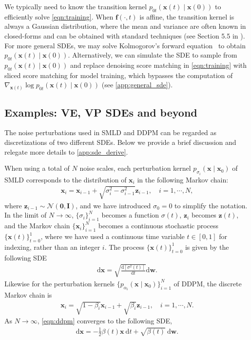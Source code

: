 \documentclass{article} %
\newcommand{\ud}{\mathrm{d}}
\newcommand{\mcal}{\mathcal}
\newcommand{\bfx}{\mathbf{x}}
\newcommand{\bfw}{\mathbf{w}}
\newcommand{\bfz}{\mathbf{z}}
\newcommand{\bfI}{\mathbf{I}}
\newcommand{\bff}{\mathbf{f}}
\newcommand{\bfzero}{\mathbf{0}}
\begin{document}
We typically need to know the transition kernel $p_{0t}(\bfx(t) \mid \bfx(0))$ to efficiently solve \cref{eqn:training}. When $\bff(\cdot, t)$ is affine, the transition kernel is always a Gaussian distribution, where the mean and variance are often known in closed-forms and can be obtained with standard techniques (see Section 5.5 in \citet{sarkka2019applied}). For more general SDEs, we may solve Kolmogorov's forward equation~\citep{oksendal2003stochastic} to obtain $p_{0t}(\bfx(t) \mid \bfx(0))$. Alternatively, we can simulate the SDE to sample from $p_{0t}(\bfx(t) \mid \bfx(0))$ and replace denoising score matching in \cref{eqn:training} with sliced score matching for model training, which bypasses the computation of $\nabla_{\bfx(t)} \log p_{0t}(\bfx(t) \mid \bfx(0))$ (see \cref{app:general_sde}).




\subsection{Examples: VE, VP SDEs and beyond}\label{sec:sde_examples}
The noise perturbations used in SMLD and DDPM can be regarded as discretizations of two different SDEs. %
Below we provide a brief discussion and relegate more details to \cref{app:sde_derive}.

When using a total of $N$ noise scales, each perturbation kernel $p_{\sigma_i}(\bfx \mid \bfx_0)$ of SMLD corresponds to the distribution of $\bfx_i$ in the following Markov chain:
\begin{align}
\bfx_i = \bfx_{i-1} + \sqrt{\sigma_{i}^2 - \sigma_{i-1}^2} \bfz_{i-1}, \quad i=1,\cdots,N \label{eqn:ncsn},
\end{align}
where $\bfz_{i-1} \sim \mcal{N}(\bfzero, \bfI)$, and we have introduced $\sigma_0 = 0$ to simplify the notation.
In the limit of $N \to \infty$, $\{\sigma_i\}_{i=1}^N$ becomes a function $\sigma(t)$, $\bfz_i$ becomes $\bfz(t)$, and the Markov chain $\{\bfx_i\}_{i=1}^N$ becomes a continuous stochastic process $\{\bfx(t)\}_{t=0}^1$, where we have used a continuous time variable $t \in [0, 1]$ for indexing, rather than an integer $i$. The process $\{\bfx(t)\}_{t=0}^1$ is given by the following SDE
\begin{align}
\ud \bfx = \sqrt{\frac{\ud \left[ \sigma^2(t) \right]}{\ud t}}\ud \bfw. \label{eqn:ncsn_sde}
\end{align}
Likewise for the perturbation kernels $\{p_{\alpha_i}(\bfx \mid \bfx_0)\}_{i=1}^N$ of DDPM, the discrete Markov chain is
\begin{align}
    \bfx_i = \sqrt{1-\beta_{i}} \bfx_{i-1} + \sqrt{\beta_{i}} \bfz_{i-1}, \quad i=1,\cdots,N. \label{eqn:ddpm}
\end{align}
As $N\to \infty$, \cref{eqn:ddpm} converges to the following SDE,
\begin{align}
\ud \bfx = -\frac{1}{2}\beta(t) \bfx~ \ud t + \sqrt{\beta(t)} ~\ud \bfw. \label{eqn:ddpm_sde}
\end{align}
\end{document}
